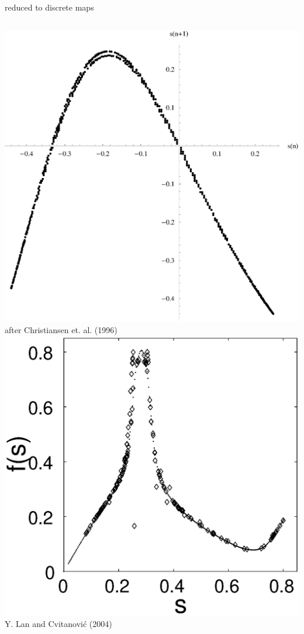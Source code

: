 \documentclass{beamer}
\begin{document}
\begin{frame}{{\KSe} reduced to discrete maps}
  \begin{columns}
	\includegraphics[width=\textwidth,clip=true]{../../figs/sPoincarePlot.eps}\\
	after Christiansen et. al. (1996)
	\includegraphics[width=\textwidth,clip=true]{../../figs/lanRM}\\
	Y. Lan and Cvitanovi\'c (2004)
 \end{columns}
\end{frame}
\end{document}

